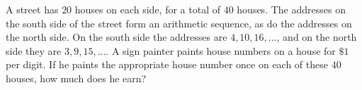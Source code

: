 A street has $20$ houses on each side, for a total of $40$ houses. The addresses on the south side of the street form an arithmetic sequence, as do the addresses on the north side. On the south side the addresses are $4,10,16,\dots$, and on the north side they are $3,9,15,\dots$. A sign painter paints house numbers on a house for $\$1$ per digit. If he paints the appropriate house number once on each of these $40$ houses, how much does he earn?
